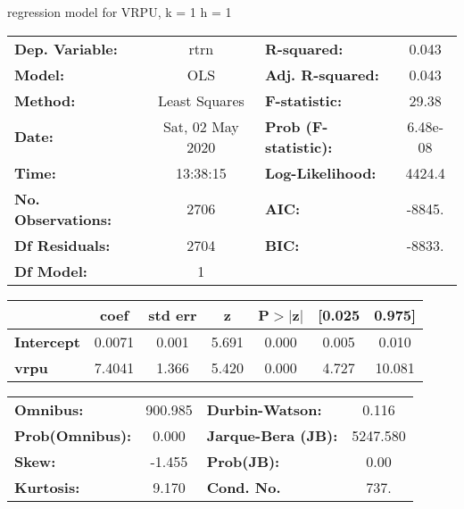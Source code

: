 regression model for VRPU, k = 1 h = 1\begin{center}
\begin{tabular}{lclc}
\toprule
\textbf{Dep. Variable:}    &       rtrn       & \textbf{  R-squared:         } &     0.043   \\
\textbf{Model:}            &       OLS        & \textbf{  Adj. R-squared:    } &     0.043   \\
\textbf{Method:}           &  Least Squares   & \textbf{  F-statistic:       } &     29.38   \\
\textbf{Date:}             & Sat, 02 May 2020 & \textbf{  Prob (F-statistic):} &  6.48e-08   \\
\textbf{Time:}             &     13:38:15     & \textbf{  Log-Likelihood:    } &    4424.4   \\
\textbf{No. Observations:} &        2706      & \textbf{  AIC:               } &    -8845.   \\
\textbf{Df Residuals:}     &        2704      & \textbf{  BIC:               } &    -8833.   \\
\textbf{Df Model:}         &           1      & \textbf{                     } &             \\
\bottomrule
\end{tabular}
\begin{tabular}{lcccccc}
                   & \textbf{coef} & \textbf{std err} & \textbf{z} & \textbf{P$> |$z$|$} & \textbf{[0.025} & \textbf{0.975]}  \\
\midrule
\textbf{Intercept} &       0.0071  &        0.001     &     5.691  &         0.000        &        0.005    &        0.010     \\
\textbf{vrpu}      &       7.4041  &        1.366     &     5.420  &         0.000        &        4.727    &       10.081     \\
\bottomrule
\end{tabular}
\begin{tabular}{lclc}
\textbf{Omnibus:}       & 900.985 & \textbf{  Durbin-Watson:     } &    0.116  \\
\textbf{Prob(Omnibus):} &   0.000 & \textbf{  Jarque-Bera (JB):  } & 5247.580  \\
\textbf{Skew:}          &  -1.455 & \textbf{  Prob(JB):          } &     0.00  \\
\textbf{Kurtosis:}      &   9.170 & \textbf{  Cond. No.          } &     737.  \\
\bottomrule
\end{tabular}
\end{center}

